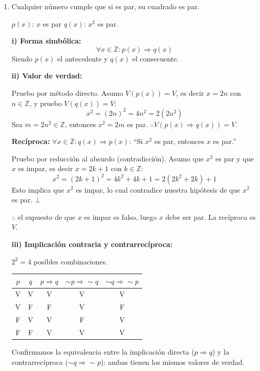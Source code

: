 \documentclass[12pt]{article}
\begin{document}
\begin{enumerate}[label=\alph*.-]

    \item Cualquier número cumple que si es par, su cuadrado es par.

    $p(x)$: $x$ es par \quad $q(x)$: $x^2$ es par.

    \textbf{i) Forma simbólica:}
    \[\forall x \in \mathbb{Z}: p(x) \Rightarrow q(x)\]
    Siendo $p(x)$ el antecedente y $q(x)$ el consecuente.

    \textbf{ii) Valor de verdad:}

    Pruebo por método directo. Asumo $V(p(x)) = V$, es decir $x = 2n$ con $n \in \mathbb{Z}$, y pruebo $V(q(x)) = V$:
    \[x^2 = (2n)^2 = 4n^2 = 2(2n^2)\]
    Sea $m = 2n^2 \in \mathbb{Z}$, entonces $x^2 = 2m$ es par. $\therefore V(p(x) \Rightarrow q(x)) = V$.

    \textbf{Recíproca:} $\forall x \in \mathbb{Z}: q(x) \Rightarrow p(x)$: ``Si $x^2$ es par, entonces $x$ es par.''

    Pruebo por reducción al absurdo (contradicción). Asumo que $x^2$ es par y que $x$ es impar, es decir $x = 2k+1$ con $k \in \mathbb{Z}$:
    \[x^2 = (2k+1)^2 = 4k^2 + 4k + 1 = 2(2k^2 + 2k) + 1\]
    Esto implica que $x^2$ es impar, lo cual contradice nuestra hipótesis de que $x^2$ es par. $\bot$ 
    
    $\therefore$ el supuesto de que $x$ es impar es falso, luego $x$ debe ser par. La recíproca es $V$.

    \textbf{iii) Implicación contraria y contrarrecíproca:}

    $2^2 = 4$ posibles combinaciones.

    \begin{center}
    \begin{tabular}{cc|c|c|c}
        \toprule
        $p$ & $q$ & $p \Rightarrow q$ & $\sim p \Rightarrow \sim q$ & $\sim q \Rightarrow \sim p$ \\
        \midrule
        V & V & V & V & V \\
        V & F & F & V & F \\
        F & V & V & F & V \\
        F & F & V & V & V \\
        \bottomrule
    \end{tabular}
    \end{center}

    Confirmamos la equivalencia entre la implicación directa ($p \Rightarrow q$) y la contrarrecíproca ($\sim q \Rightarrow \sim p$): ambas tienen los mismos valores de verdad.


\end{enumerate}
\end{document}
